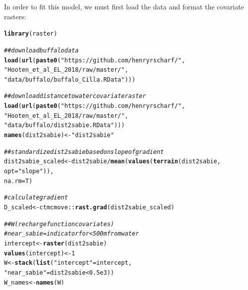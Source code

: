 \documentclass[12pt]{article}\usepackage[]{graphicx}\usepackage[]{color}
\makeatletter
\newcommand{\hlnum}[1]{\textcolor[rgb]{0.686,0.059,0.569}{#1}}%
\newcommand{\hlstr}[1]{\textcolor[rgb]{0.192,0.494,0.8}{#1}}%
\newcommand{\hlcom}[1]{\textcolor[rgb]{0.678,0.584,0.686}{\textit{#1}}}%
\newcommand{\hlopt}[1]{\textcolor[rgb]{0,0,0}{#1}}%
\newcommand{\hlstd}[1]{\textcolor[rgb]{0.345,0.345,0.345}{#1}}%
\newcommand{\hlkwb}[1]{\textcolor[rgb]{0.69,0.353,0.396}{#1}}%
\newcommand{\hlkwc}[1]{\textcolor[rgb]{0.333,0.667,0.333}{#1}}%
\newcommand{\hlkwd}[1]{\textcolor[rgb]{0.737,0.353,0.396}{\textbf{#1}}}%
\newenvironment{kframe}{%
 \def\at@end@of@kframe{}%
 \ifinner\ifhmode%
  \def\at@end@of@kframe{\end{minipage}}%
  \begin{minipage}{\columnwidth}%
 \fi\fi%
 \def\FrameCommand##1{\hskip\@totalleftmargin \hskip-\fboxsep
 \colorbox{shadecolor}{##1}\hskip-\fboxsep
     \hskip-\linewidth \hskip-\@totalleftmargin \hskip\columnwidth}%
 \MakeFramed {\advance\hsize-\width
   \@totalleftmargin\z@ \linewidth\hsize
   \@setminipage}}%
 {\par\unskip\endMakeFramed%
 \at@end@of@kframe}
\newenvironment{knitrout}{}{} %
\makeatother
\begin{document}
In order to fit this model, we must first load the data and format the covariate rasters:
\begin{knitrout}
\color{fgcolor}\begin{kframe}
\begin{alltt}
\hlkwd{library}\hlstd{(raster)}

\hlcom{## download buffalo data}
\hlkwd{load}\hlstd{(}\hlkwd{url}\hlstd{(}\hlkwd{paste0}\hlstd{(}\hlstr{"https://github.com/henryrscharf/"}\hlstd{,}
         \hlstr{"Hooten_et_al_EL_2018/raw/master/"}\hlstd{,}
         \hlstr{"data/buffalo/buffalo_Cilla.RData"}\hlstd{)))}

\hlcom{## download distance to water covariate raster}
\hlkwd{load}\hlstd{(}\hlkwd{url}\hlstd{(}\hlkwd{paste0}\hlstd{(}\hlstr{"https://github.com/henryrscharf/"}\hlstd{,}
                \hlstr{"Hooten_et_al_EL_2018/raw/master/"}\hlstd{,}
                \hlstr{"data/buffalo/dist2sabie.RData"}\hlstd{)))}
\hlkwd{names}\hlstd{(dist2sabie)} \hlkwb{<-} \hlstr{"dist2sabie"}

\hlcom{## standardize dist2sabie based on slope of gradient}
\hlstd{dist2sabie_scaled} \hlkwb{<-} \hlstd{dist2sabie} \hlopt{/} \hlkwd{mean}\hlstd{(}\hlkwd{values}\hlstd{(}\hlkwd{terrain}\hlstd{(dist2sabie,}
                                                      \hlkwc{opt} \hlstd{=} \hlstr{"slope"}\hlstd{)),}
                                       \hlkwc{na.rm} \hlstd{= T)}

\hlcom{# calculate gradient}
\hlstd{D_scaled} \hlkwb{<-} \hlstd{ctmcmove}\hlopt{::}\hlkwd{rast.grad}\hlstd{(dist2sabie_scaled)}

\hlcom{## W (recharge function covariates)}
\hlcom{# near_sabie = indicator for <500m from water}
\hlstd{intercept} \hlkwb{<-} \hlkwd{raster}\hlstd{(dist2sabie)}
\hlkwd{values}\hlstd{(intercept)} \hlkwb{<-} \hlnum{1}
\hlstd{W} \hlkwb{<-} \hlkwd{stack}\hlstd{(}\hlkwd{list}\hlstd{(}\hlstr{"intercept"} \hlstd{= intercept,}
                \hlstr{"near_sabie"} \hlstd{= dist2sabie} \hlopt{<} \hlnum{0.5e3}\hlstd{))}
\hlstd{W_names} \hlkwb{<-} \hlkwd{names}\hlstd{(W)}


\end{alltt}
\end{kframe}
\end{knitrout}
\end{document}
